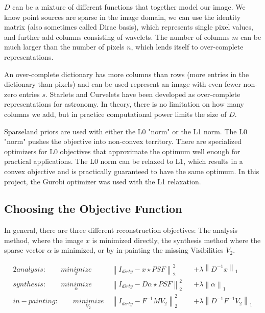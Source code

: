 $D$ can be a mixture of different functions that together model our image. We know point sources are sparse in the image domain, we can use the identity matrix (also sometimes called Dirac basis), which represents single pixel values, and further add columns consisting of wavelets. The number of columns $m$ can be much larger than the number of pixels $n$, which lends itself to over-complete representations.

An over-complete dictionary has more columns than rows (more entries in the dictionary than pixels) and can be used represent an image with even fewer non-zero entries $s$. Starlets\cite{starck2015starlet} and Curvelets\cite{starck2003astronomical} have been developed as over-complete representations for astronomy. In theory, there is no limitation on how many columns we add, but in practice computational power limits the size of $D$.

Sparseland priors are used with either the L0 "norm" or the L1 norm. The L0 "norm" pushes the objective into non-convex territory. There are specialized optimizers for L0 objectives that approximate the optimum well enough for practical applications. The L0 norm can be relaxed to L1, which results in a convex objective and is practically guaranteed to have the same optimum. In this project, the Gurobi\cite{gurobi2018optimizer} optimizer was used with the L1 relaxation.


\subsection{Choosing the Objective Function} \label{cs:objective}
In general, there are three different reconstruction objectives: The analysis method, where the image $x$ is minimized directly, the synthesis method where the sparse vector $\alpha$ is minimized, or by in-painting the missing Visibilities $V_2$.

\begin{alignat*}{2}
analysis:\qquad \underset{x}{minimize} \:& \left \| I_{dirty} - x \star PSF \right \|_2^2 &&+  \lambda \left \| D^{-1}x \right \|_1 \\
synthesis:\qquad \underset{\alpha}{minimize} \:& \left \| I_{dirty} - D \alpha \star PSF \right \|_2^2 &&+ \lambda \left \| \alpha \right \|_1 \\
in-painting:\qquad \underset{V_2}{minimize} \:& \left \|  I_{dirty} - F^{-1} M V_2 \right \|_2^2 &&+ \lambda \left \| D^{-1}F^{-1}V_2\right \|_1
\end{alignat*}

